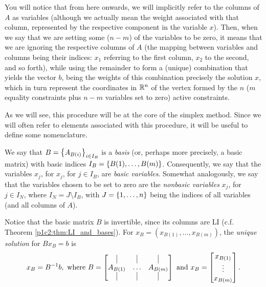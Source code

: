 You will notice that from here onwards, we will implicitly refer to the columns of $A$ as variables (although we actually mean the weight associated with that column, represented by the respective component in the variable $x$). Then, when we say that we are setting some ($n-m$) of the variables to be zero, it means that we are ignoring the respective columns of $A$ (the mapping between variables and columns being their indices: $x_1$ referring to the first column, $x_2$ to the second, and so forth), while using the remainder to form a (unique) combination that yields the vector $b$, being the weights of this combination precisely the solution $x$, which in turn represent the coordinates in $\mathbb{R}^n$ of the vertex formed by the $n$ ($m$ equality constraints plus $n-m$ variables set to zero) active constraints.   

As we will see, this procedure will be at the core of the simplex method. Since we will often refer to elements associated with this procedure, it will be useful to define some nomenclature.

We say that $B = \left\{ A_{B(i)} \right \}_{i \in I_B}$ is a \emph{basis} (or, perhaps more precisely, a basic matrix) with basic indices $I_B = \left\{ B(1), \dots, B(m) \right \}$. Consequently, we say that the variables $x_j$, for $x_j$, for $j \in I_B$, are \emph{basic variables}. Somewhat analogously, we say that the variables chosen to be set to zero are the \emph{nonbasic variables} $x_j$, for $j \in I_N$, where $I_N = J \setminus I_B$, with $J = \left\{ 1, \dots, n \right \}$ being the indices of all variables (and all columns of $A$).
 
 Notice that the basic matrix $B$ is invertible, since its columns are LI (c.f. Theorem \ref{p1c2:thm:LI_and_bases}). For $x_B = (x_{B(1)}, \dots, x_{B(m)})$, the \emph{unique solution} for $Bx_B = b$ is 
%
\begin{equation*}
	x_B = B^{-1}b, \text{ where } 
	B = \begin{bmatrix} \vline & \vline & \vline \\
					  A_{B(1)} & \dots & A_{B(m)} \\
	    	    		\vline & \vline & \vline	
		\end{bmatrix} \text{ and } 
	x_B =  \begin{bmatrix}   x_{B(1)} \\
		 			     		 \vdots   \\
		 			     		 x_{B(m)}	
		   \end{bmatrix}.
\end{equation*}
%

